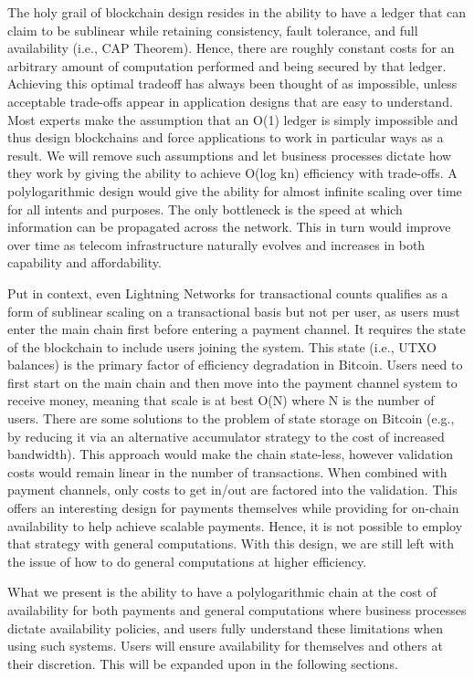 \documentclass[peerreview]{ieeesyscoin}
\begin{document}
The holy grail of blockchain design resides in the ability to have a ledger that can claim to be sublinear while retaining consistency, fault tolerance, and full availability (i.e., CAP Theorem). Hence, there are roughly constant costs for an arbitrary amount of computation performed and being secured by that ledger. Achieving this optimal tradeoff has always been thought of as impossible, unless acceptable trade-offs appear in application designs that are easy to understand. Most experts make the assumption that an O(1) ledger is simply impossible and thus design blockchains and force applications to work in particular ways as a result. We will remove such assumptions and let business processes dictate how they work by giving the ability to achieve O(log kn) efficiency with trade-offs. A polylogarithmic design would give the ability for almost infinite scaling over time for all intents and purposes. The only bottleneck is the speed at which information can be propagated across the network. This in turn would improve over time as telecom infrastructure naturally evolves and increases in both capability and affordability.

Put in context, even Lightning Networks for transactional counts qualifies as a form of sublinear scaling on a transactional basis but not per user, as users must enter the main chain first before entering a payment channel. It requires the state of the blockchain to include users joining the system. This state (i.e., UTXO balances) is the primary  factor of efficiency degradation in Bitcoin. Users need to first start on the main chain and then move into the payment channel system to receive money, meaning that scale is at best O(N) where N is the number of users. There are some solutions to the problem of state storage on Bitcoin \cite{Dry19} (e.g., by reducing it via an alternative accumulator strategy to the cost of increased bandwidth). This approach would make the chain state-less, however validation costs would remain linear in the number of transactions. When combined with payment channels, only costs to get in/out are factored into the validation. This offers an interesting design for payments themselves while providing for on-chain availability to help achieve scalable payments. Hence, it is not possible to employ that strategy with general computations. With this design, we are still left with the issue of how to do general computations at higher efficiency.

What we present is the ability to have a polylogarithmic chain at the cost of availability for both payments and general computations where business processes dictate availability policies, and users fully understand these limitations when using such systems. Users will ensure availability for themselves and others at their discretion.  This will be expanded upon in the following sections.
\end{document}
